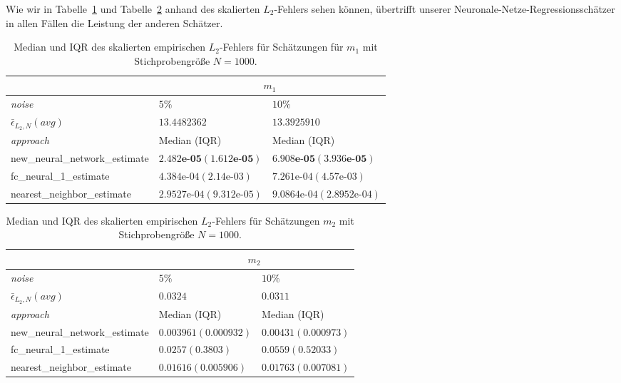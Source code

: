 Wie wir in Tabelle~\ref{tab:truthTablesm1} und Tabelle~\ref{tab:truthTablesm2} anhand des skalierten $L_2$-Fehlers sehen können, übertrifft unserer Neuronale-Netze-Regressionsschätzer in allen Fällen die Leistung der anderen Schätzer. 
\begin{table}
\centering
\begin{tabular}{ |p{5cm}||p{4cm}|p{4cm}|}
 \hline
 & \multicolumn{2}{|c|}{$m_1$}\\
 \hline
 \textit{noise}& $5\%$ & $10\%$ \\
 \hline
 $\bar{\epsilon}_{L_2,N}(avg)$& $13.4482362$ & $13.3925910$ \\
 \hline
 \textit{approach}&  Median (IQR) &  Median (IQR)   \\
 \hline
 new\_neural\_network\_estimate & $\mathbf{2.482\textbf{e-}05 (1.612\textbf{e-}05)}$   & $\mathbf{6.908\textbf{e-}05 (3.936\textbf{e-}05)}$  \\
 fc\_neural\_1\_estimate & $4.384\text{e-}04 (2.14\text{e-}03)$ &   $7.261\text{e-}04 (4.57\text{e-}03)$ \\
 nearest\_neighbor\_estimate & $2.9527\text{e-}04 (9.312\text{e-}05)$ & $9.0864\text{e-}04 (2.8952\text{e-}04)$\\
 \hline
\end{tabular}
    \caption{Median und IQR des skalierten empirischen $L_2$-Fehlers für Schätzungen für $m_1$ mit Stichprobengröße $N = 1000$.}
     \label{tab:truthTablesm1}   
\end{table}
    
    \begin{table}
\centering
\begin{tabular}{ |p{5cm}||p{4cm}|p{4cm}|}
 \hline
 & \multicolumn{2}{|c|}{$m_2$}\\
 \hline
 \textit{noise}& $5\%$ & $10\%$ \\
 \hline
 $\bar{\epsilon}_{L_2,N}(avg)$& $0.0324$ & $0.0311$ \\
 \hline
 \textit{approach}&  Median (IQR) &  Median (IQR)   \\
 \hline
 new\_neural\_network\_estimate & $\mathbf{0.003961 (0.000932)}$   & $\mathbf{0.00431 (0.000973)}$  \\
 fc\_neural\_1\_estimate & $0.0257 (0.3803)$ &   $0.0559 (0.52033)$ \\
 nearest\_neighbor\_estimate & $0.01616 (0.005906)$ &$0.01763 (0.007081)$\\
 \hline
\end{tabular}
    \caption{Median und IQR des skalierten empirischen $L_2$-Fehlers für Schätzungen $m_2$ mit Stichprobengröße $N = 1000$.}
    \label{tab:truthTablesm2}   
\end{table}
